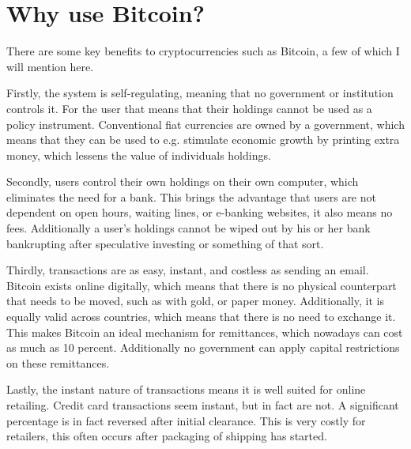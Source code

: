 
\chapter{Why use Bitcoin?}

There are some key benefits to cryptocurrencies such as Bitcoin, a
few of which I will mention here.

Firstly, the system is self-regulating, meaning that no government
or institution controls it. For the user that means that their holdings
cannot be used as a policy instrument. Conventional fiat currencies
are owned by a government, which means that they can be used to e.g.
stimulate economic growth by printing extra money, which lessens the
value of individuals holdings.

Secondly, users control their own holdings on their own computer,
which eliminates the need for a bank. This brings the advantage that
users are not dependent on open hours, waiting lines, or e-banking
websites, it also means no fees. Additionally a user's holdings cannot
be wiped out by his or her bank bankrupting after speculative investing
or something of that sort.

Thirdly, transactions are as easy, instant, and costless as sending
an email. Bitcoin exists online digitally, which means that there
is no physical counterpart that needs to be moved, such as with gold,
or paper money. Additionally, it is equally valid across countries,
which means that there is no need to exchange it. This makes Bitcoin
an ideal mechanism for remittances, which nowadays can cost as much
as 10 percent. Additionally no government can apply capital restrictions
on these remittances.

Lastly, the instant nature of transactions means it is well suited
for online retailing. Credit card transactions seem instant, but in
fact are not. A significant percentage is in fact reversed after initial
clearance. This is very costly for retailers, this often occurs after
packaging of shipping has started.
